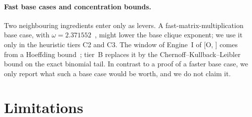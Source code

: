\documentclass[10pt]{amsart}
\theoremstyle{definition}
\theoremstyle{remark}
\numberwithin{equation}{section}
\newcommand{\Oa}[1][]{\textup{[O\if\relax\detokenize{#1}\relax\else, #1\fi]}}
\begin{document}
\paragraph{Fast base cases and concentration bounds.} Two neighbouring ingredients enter only as
levers. A fast-matrix-multiplication base case, with $\omega=2.371552$~\cite{VXXZ24}, might lower the
base clique exponent; we use it only in the heuristic tiers C2 and C3. The window of Engine~I of
\Oa{} comes from a Hoeffding bound~\cite{Hoeffding63}; tier~B replaces it by the
Chernoff--Kullback--Leibler bound on the exact binomial tail. In contrast to a proof of a faster
base case, we only report what such a base case would be worth, and we do not claim it.

\section{Limitations}\label{sec:limitations}
\end{document}
